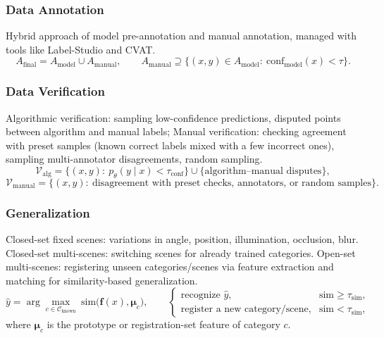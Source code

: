 \documentclass[12pt,a4paper]{article}
\begin{document}
\subsubsection{Data Annotation}
Hybrid approach of model pre-annotation and manual annotation, managed with tools like Label-Studio and CVAT.
\begin{equation}
A_{\mathrm{final}}=A_{\mathrm{model}}\cup A_{\mathrm{manual}},\qquad
A_{\mathrm{manual}}\supseteq\bigl\{(x,y)\in A_{\mathrm{model}}:\ \mathrm{conf}_{\mathrm{model}}(x)<\tau\bigr\}.
\label{eq:data-annotation}
\end{equation}

\subsubsection{Data Verification}
Algorithmic verification: sampling low-confidence predictions, disputed points between algorithm and manual labels; Manual verification: checking agreement with preset samples (known correct labels mixed with a few incorrect ones), sampling multi-annotator disagreements, random sampling.
\begin{equation}
\mathcal{V}_{\mathrm{alg}}=\bigl\{(x,y):\ p_{\theta}(y\mid x)<\tau_{\mathrm{conf}}\bigr\}\cup\bigl\{\text{algorithm--manual disputes}\bigr\},
\label{eq:verify-alg}
\end{equation}
\begin{equation}
\mathcal{V}_{\mathrm{manual}}=\bigl\{(x,y):\ \text{disagreement with preset checks, annotators, or random samples}\bigr\}.
\label{eq:verify-manual}
\end{equation}

\subsubsection{Generalization}
Closed-set fixed scenes: variations in angle, position, illumination, occlusion, blur.
Closed-set multi-scenes: switching scenes for already trained categories.
Open-set multi-scenes: registering unseen categories/scenes via feature extraction and matching for similarity-based generalization.
\begin{equation}
\hat{y}=\arg\max_{c\in\mathcal{C}_{\mathrm{known}}}\ \mathrm{sim}\bigl(\mathbf{f}(x),\boldsymbol{\mu}_c\bigr),\qquad
\begin{cases}
\text{recognize } \hat{y}, & \mathrm{sim}\ge\tau_{\mathrm{sim}},\\[2pt]
\text{register a new category/scene}, & \mathrm{sim}<\tau_{\mathrm{sim}},
\end{cases}
\label{eq:generalization-open}
\end{equation}
where $\boldsymbol{\mu}_c$ is the prototype or registration-set feature of category $c$.
\end{document}

